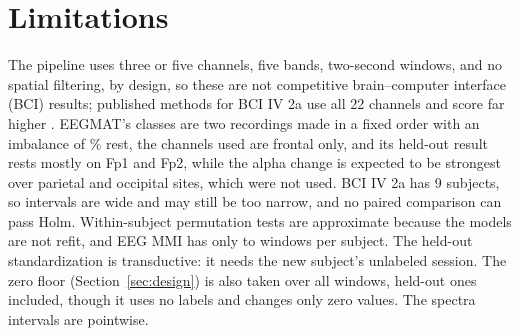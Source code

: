 \section{Limitations}

The pipeline uses three or five channels, five bands, two-second windows, and no spatial filtering, by design, so these are not competitive brain--computer interface (BCI) results; published methods for BCI IV 2a use all 22 channels and score far higher \cite{ang2012}. EEGMAT's classes are two recordings made in a fixed order with an imbalance of \% rest, the channels used are frontal only, and its held-out result rests mostly on Fp1 and Fp2, while the alpha change is expected to be strongest over parietal and occipital sites, which were not used. BCI IV 2a has 9 subjects, so intervals are wide and may still be too narrow, and no paired comparison can pass Holm. Within-subject permutation tests are approximate because the models are not refit, and EEG MMI has only  to  windows per subject. The held-out standardization is transductive: it needs the new subject's unlabeled session. The zero floor (Section~\ref{sec:design}) is also taken over all windows, held-out ones included, though it uses no labels and changes only zero values. The spectra intervals are pointwise.
